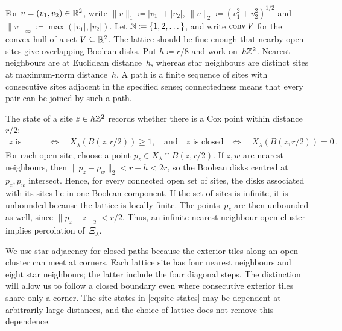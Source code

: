 \documentclass[11pt,letterpaper]{article}
\begin{document}
For $v=(v_1,v_2)\in\mathbb R^2$, write $\lVert v\rVert_1\coloneqq\lvert v_1\rvert+\lvert v_2\rvert$, $\lVert v\rVert_2\coloneqq(v_1^2+v_2^2)^{1/2}$ and $\lVert v\rVert_\infty\coloneqq\max(\lvert v_1\rvert,\lvert v_2\rvert)$. Let $\mathbb N\coloneqq\{1,2,\dots\}$, and write $\operatorname{conv} V$ for the convex hull of a set $V\subseteq\mathbb R^2$. The lattice should be fine enough that nearby open sites give overlapping Boolean disks. Put $h\coloneqq r/8$ and work on~$h\mathbb Z^2$. Nearest neighbours are at Euclidean distance~$h$, whereas star neighbours are distinct sites at maximum-norm distance~$h$. A path is a finite sequence of sites with consecutive sites adjacent in the specified sense; connectedness means that every pair can be joined by such a path.

The state of a site $z\in h\mathbb Z^2$ records whether there is a Cox point within distance~$r/2$:
\begin{equation}\label{eq:site-states}
  \begin{aligned}
    z\text{ is open}&\quad\Longleftrightarrow\quad X_\lambda(B(z,r/2))\ge1,\quad\text{and}\quad
    z\text{ is closed}&\quad\Longleftrightarrow\quad X_\lambda(B(z,r/2))=0\,.
  \end{aligned}
\end{equation}
For each open site, choose a point $p_z\in X_\lambda\cap B(z,r/2)$. If $z,w$ are nearest neighbours, then $\lVert p_z-p_w\rVert_2<r+h<2r$, so the Boolean disks centred at $p_z,p_w$ intersect. Hence, for every connected open set of sites, the disks associated with its sites lie in one Boolean component. If the set of sites is infinite, it is unbounded because the lattice is locally finite. The points~$p_z$ are then unbounded as well, since $\lVert p_z-z\rVert_2<r/2$. Thus, an infinite nearest-neighbour open cluster implies percolation of~$\Xi_\lambda$.

We use star adjacency for closed paths because the exterior tiles along an open cluster can meet at corners. Each lattice site has four nearest neighbours and eight star neighbours; the latter include the four diagonal steps. The distinction will allow us to follow a closed boundary even where consecutive exterior tiles share only a corner. The site states in \eqref{eq:site-states} may be dependent at arbitrarily large distances, and the choice of lattice does not remove this dependence.
\end{document}
